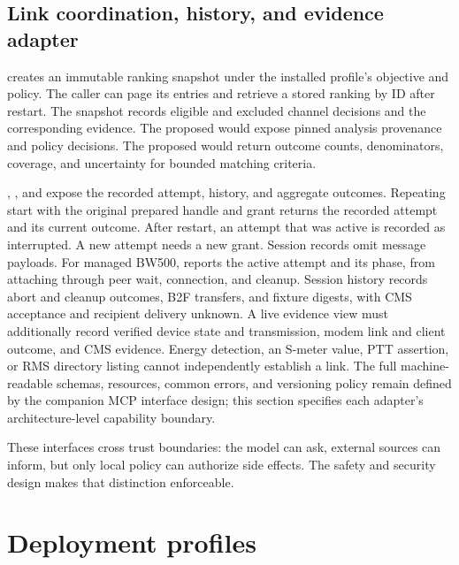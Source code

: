 \documentclass[11pt,a4paper]{article}
\begin{document}
\subsection{Link coordination, history, and evidence adapter}
 creates an immutable ranking snapshot under the
installed profile's objective and policy. The caller can page its entries
and retrieve a stored ranking by ID after restart. The snapshot records
eligible and excluded channel decisions and the corresponding evidence.
The proposed  would expose pinned analysis
provenance and policy decisions. The proposed
 would return outcome counts,
denominators, coverage, and uncertainty for bounded matching criteria.

, , and
 expose the recorded attempt, history, and aggregate
outcomes. Repeating start with the original prepared handle and grant
returns the recorded attempt and its current outcome. After restart,
an attempt that was active is recorded as interrupted. A new attempt
needs a new grant. Session records omit message
payloads. For managed BW500,  reports the active
attempt and its phase, from attaching through peer wait, connection,
and cleanup. Session history records abort and cleanup outcomes, B2F
transfers, and fixture digests, with CMS acceptance and recipient delivery
unknown. A live evidence view must additionally record verified device
state and transmission, modem link and client outcome, and CMS evidence.
Energy detection, an S-meter value, PTT assertion, or RMS directory listing
cannot independently establish a link. The full machine-readable schemas,
resources, common errors, and versioning policy remain defined by the
companion MCP interface design; this section specifies each adapter's
architecture-level capability boundary.

These interfaces cross trust boundaries: the model can ask, external sources
can inform, but only local policy can authorize side effects. The safety and
security design makes that distinction enforceable.



\section{Deployment profiles}
\end{document}
